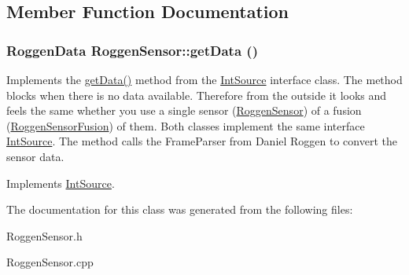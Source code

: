 \subsection{Member Function Documentation}
\hypertarget{classRoggenSensor_a296d8de06a1a0d3e0645389a34f42865}{
\subsubsection[{getData}]{\setlength{\rightskip}{0pt plus 5cm}RoggenData RoggenSensor::getData ()}}
\label{classRoggenSensor_a296d8de06a1a0d3e0645389a34f42865}
Implements the \hyperlink{classRoggenSensor_a296d8de06a1a0d3e0645389a34f42865}{getData()} method from the \hyperlink{classIntSource}{IntSource} interface class. The method blocks when there is no data available. Therefore from the outside it looks and feels the same whether you use a single sensor (\hyperlink{classRoggenSensor}{RoggenSensor}) of a fusion (\hyperlink{classRoggenSensorFusion}{RoggenSensorFusion}) of them. Both classes implement the same interface \hyperlink{classIntSource}{IntSource}. The method calls the FrameParser from Daniel Roggen to convert the sensor data. 

Implements \hyperlink{classIntSource}{IntSource}.

The documentation for this class was generated from the following files:\begin{DoxyCompactItemize}
\item 
RoggenSensor.h\item 
RoggenSensor.cpp\end{DoxyCompactItemize}
